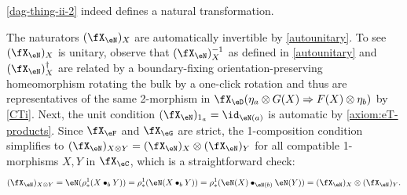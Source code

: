 \documentclass[12pt,reqno]{amsart}
\newcommand{\C}{\eC}
\newcommand{\D}{\eD}
\begin{document}
\begin{lemma}
\label{dag-thing-ii-2-pf}
    \cref{dag-thing-ii-2} indeed defines a natural transformation.
\end{lemma}

\begin{pf}
The naturators $(\fX_\eN)_X$ are automatically invertible by \cref{autounitary}. To see $(\fX_\eN)_X$ is unitary, observe that $(\fX_\eN)_X^{-1}$ as defined in \cref{autounitary} and $(\fX_\eN)_X^\dag$ are related by a boundary-fixing orientation-preserving homeomorphism rotating the bulk by a one-click rotation and thus are representatives of the same 2-morphism in $\fX_\D(\eta_a\otimes G(X)\Rightarrow F(X)\otimes\eta_b)$ by \ref{CTi}. Next, the unit condition $(\fX_\eN)_{1_a}=\id_{\eN(a)}$ is automatic by \ref{axiom:eT-products}. Since $\fX_\eF$ and $\fX_\eG$ are strict, the 1-composition condition simplifies to $(\fX_\eN)_{X\otimes Y}=(\fX_\eN)_X\otimes(\fX_\eN)_Y$ for all compatible 1-morphisms $X,Y$ in $\fX_\C$, which is a straightforward 
check: 
\[
(\fX_\eN)_{X\otimes Y} = \eN(\rho^1_*(X \bullet_b Y)) = \rho^1_*(\eN(X \bullet_b Y)) = \rho^1_*(\eN(X) \bullet_{\eN(b)} \eN(Y)) = (\fX_\eN)_X \otimes (\fX_\eN)_Y.
\]


\end{pf}
\end{document}
